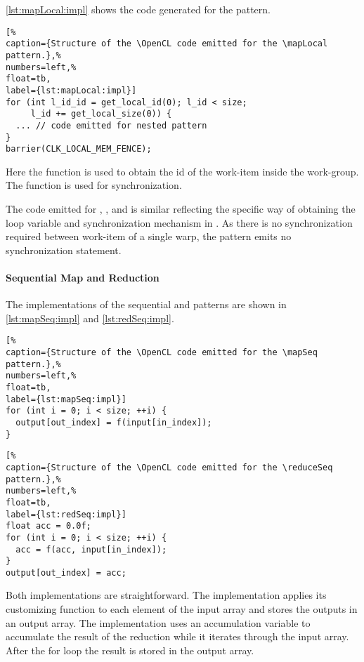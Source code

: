 \autoref{lst:mapLocal:impl} shows the \OpenCL code generated for the \mapLocal pattern.
%
\begin{lstlisting}[%                                                             
caption={Structure of the \OpenCL code emitted for the \mapLocal pattern.},%
numbers=left,%
float=tb,
label={lst:mapLocal:impl}]
for (int l_id_id = get_local_id(0); l_id < size;
     l_id += get_local_size(0)) {
  ... // code emitted for nested pattern
}
barrier(CLK_LOCAL_MEM_FENCE);
\end{lstlisting}
%
Here the \OpenCL {} function is used to obtain the id of the work-item inside the work-group.
The  function is used for synchronization.

The \OpenCL code emitted for \mapGlobal, \mapWarp, and \mapLane is similar reflecting the specific way of obtaining the loop variable and synchronization mechanism in \OpenCL.
As there is no synchronization required between work-item of a single warp, the \mapLane pattern emits no synchronization statement.

\paragraph{Sequential Map and Reduction}
The \OpenCL implementations of the sequential \mapSeq and \reduceSeq patterns are shown in \autoref{lst:mapSeq:impl} and \autoref{lst:redSeq:impl}.
%
\begin{lstlisting}[%                                                             
caption={Structure of the \OpenCL code emitted for the \mapSeq pattern.},%
numbers=left,%
float=tb,
label={lst:mapSeq:impl}]
for (int i = 0; i < size; ++i) {
  output[out_index] = f(input[in_index]);
}
\end{lstlisting}
%
%
\begin{lstlisting}[%                                                             
caption={Structure of the \OpenCL code emitted for the \reduceSeq pattern.},%
numbers=left,%
float=tb,
label={lst:redSeq:impl}]
float acc = 0.0f;
for (int i = 0; i < size; ++i) {
  acc = f(acc, input[in_index]);
}
output[out_index] = acc;
\end{lstlisting}
%
Both implementations are straightforward.
The \mapSeq implementation applies its customizing function to each element of the input array and stores the outputs in an output array.
The \reduceSeq implementation uses an accumulation variable to accumulate the result of the reduction while it iterates through the input array.
After the for loop the result is stored in the output array.

